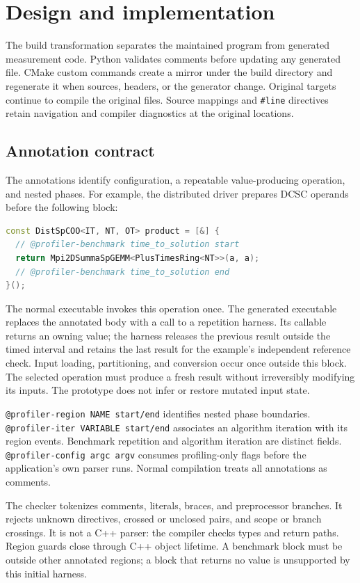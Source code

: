 \documentclass[10pt]{article}
\begin{document}
\section{Design and implementation}
The build transformation separates the maintained program from generated measurement
code. Python validates comments before updating any generated file. CMake custom
commands create a mirror under the build directory and regenerate it when sources,
headers, or the generator change. Original targets continue to compile the original
files. Source mappings and \texttt{\#line} directives retain navigation and compiler
diagnostics at the original locations.

\subsection{Annotation contract}
The annotations identify configuration, a repeatable value-producing operation,
and nested phases. For example, the distributed driver prepares DCSC operands before
the following block:
\begin{lstlisting}[language=C++]
const DistSpCOO<IT, NT, OT> product = [&] {
  // @profiler-benchmark time_to_solution start
  return Mpi2DSummaSpGEMM<PlusTimesRing<NT>>(a, a);
  // @profiler-benchmark time_to_solution end
}();
\end{lstlisting}
The normal executable invokes this operation once. The generated executable replaces
the annotated body with a call to a repetition harness. Its callable returns an
owning value; the harness releases the previous result outside the timed interval
and retains the last result for the example's independent reference check. Input
loading, partitioning, and conversion occur once outside this block. The selected
operation must produce a fresh result without irreversibly modifying its inputs.
The prototype does not infer or restore mutated input state.

\texttt{@profiler-region NAME start/end} identifies nested phase boundaries.
\texttt{@profiler-iter VARIABLE start/end} associates an algorithm iteration with
its region events. Benchmark repetition and algorithm iteration are distinct fields.
\texttt{@profiler-config argc argv} consumes profiling-only flags before the
application's own parser runs. Normal compilation treats all annotations as comments.

The checker tokenizes comments, literals, braces, and preprocessor branches. It
rejects unknown directives, crossed or unclosed pairs, and scope or branch crossings.
It is not a C++ parser: the compiler checks types and return paths. Region guards
close through C++ object lifetime. A benchmark block must be outside other annotated
regions; a block that returns no value is unsupported by this initial harness.
\end{document}
